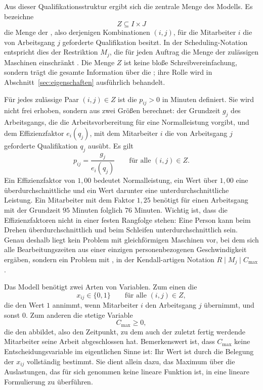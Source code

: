 Aus dieser Qualifikationsstruktur ergibt sich die zentrale Menge des Modells. Es
bezeichne
\begin{equation}
  Z \subseteq I \times J
  \label{eq:zulaessig}
\end{equation}
die Menge der , also derjenigen Kombinationen $(i,j)$,
für die Mitarbeiter $i$ die von Arbeitsgang $j$ geforderte Qualifikation besitzt.
In der Scheduling-Notation entspricht dies der Restriktion $M_j$, die für jeden
Auftrag die Menge der zulässigen Maschinen einschränkt
\parencite{pinedo2016scheduling}. Die Menge $Z$ ist keine bloße
Schreibvereinfachung, sondern trägt die gesamte Information über die
; ihre Rolle wird in
Abschnitt~\ref{sec:eigenschaften} ausführlich behandelt.

Für jedes zulässige Paar $(i,j) \in Z$ ist die 
$p_{ij} > 0$ in Minuten definiert. Sie wird nicht frei erhoben, sondern aus zwei
Größen berechnet: der Grundzeit $g_j$ des Arbeitsgangs, die die
Arbeitsvorbereitung für eine Normalleistung vorgibt, und dem Effizienzfaktor
$e_i(q_j)$, mit dem Mitarbeiter $i$ die von Arbeitsgang $j$ geforderte
Qualifikation $q_j$ ausübt. Es gilt
\begin{equation}
  p_{ij} = \frac{g_j}{e_i(q_j)}
  \qquad \text{für alle } (i,j) \in Z .
  \label{eq:bearbeitungszeit}
\end{equation}
Ein Effizienzfaktor von $1{,}00$ bedeutet Normalleistung, ein Wert über $1{,}00$
eine überdurchschnittliche und ein Wert darunter eine unterdurchschnittliche
Leistung. Ein Mitarbeiter mit dem Faktor $1{,}25$ benötigt für einen
Arbeitsgang mit der Grundzeit $95$ Minuten folglich $76$ Minuten. Wichtig ist,
dass die Effizienzfaktoren nicht in einer festen Rangfolge stehen: Eine Person
kann beim Drehen überdurchschnittlich und beim Schleifen unterdurchschnittlich
sein. Genau deshalb liegt kein Problem mit gleichförmigen Maschinen vor, bei dem
sich alle Bearbeitungszeiten aus einer einzigen personenbezogenen Geschwindigkeit
ergäben, sondern ein Problem mit , in
der Kendall-artigen Notation $R \mid M_j \mid C_{\max}$
\parencite{pinedo2016scheduling}.

Das Modell benötigt zwei Arten von Variablen. Zum einen die
\begin{equation}
  x_{ij} \in \{0,1\}
  \qquad \text{für alle } (i,j) \in Z ,
  \label{eq:xvar}
\end{equation}
die den Wert $1$ annimmt, wenn Mitarbeiter $i$ den Arbeitsgang $j$ übernimmt, und
sonst $0$. Zum anderen die stetige Variable
\begin{equation}
  C_{\max} \geq 0 ,
  \label{eq:cmaxvar}
\end{equation}
die den  abbildet, also den Zeitpunkt, zu dem auch der zuletzt
fertig werdende Mitarbeiter seine Arbeit abgeschlossen hat. Bemerkenswert ist,
dass $C_{\max}$ keine Entscheidungsvariable im eigentlichen Sinne ist: Ihr Wert
ist durch die Belegung der $x_{ij}$ vollständig bestimmt. Sie dient allein dazu,
das Maximum über die Auslastungen, das für sich genommen keine lineare Funktion
ist, in eine lineare Formulierung zu überführen.


